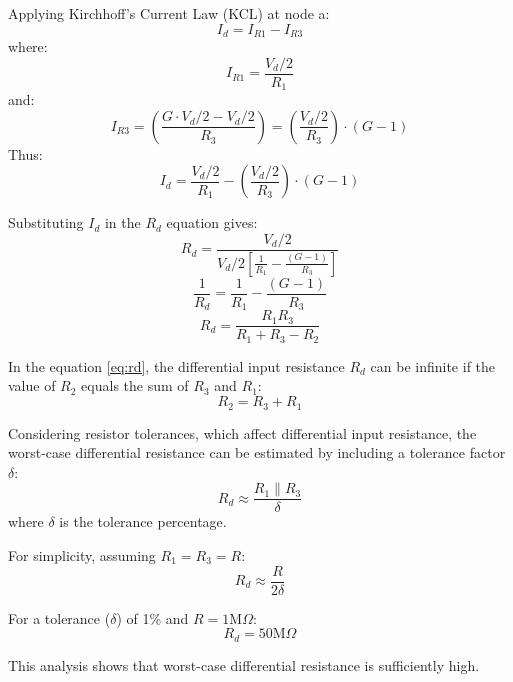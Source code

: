 \begin{itemize}
Applying Kirchhoff's Current Law (KCL) at node a:
\begin{equation}
	I_d = I_{R1} - I_{R3}
	\label{eq:kcl}
\end{equation}
where:
\begin{equation}
	I_{R1} = \frac{V_d / 2}{R_1}
	\label{eq:ir1}
\end{equation}
and:
\begin{equation}
	I_{R3} = \left( \frac{G \cdot V_d / 2 - V_d / 2}{R_3} \right) = \left( \frac{V_d / 2}{R_3} \right) \cdot (G - 1)
	\label{eq:ir3}
\end{equation}
Thus:
\begin{equation}
	I_d = \frac{V_d / 2}{R_1} - \left( \frac{V_d / 2}{R_3} \right) \cdot (G - 1)
	\label{eq:id}
\end{equation}

Substituting \(I_d\) in the \(R_d\) equation gives:
\[
R_d = \frac{V_d / 2}{V_d / 2 \left[ \frac{1}{R_1} - \frac{(G - 1)}{R_3} \right]}
\]
\[
\frac{1}{R_d} = \frac{1}{R_1} - \frac{(G - 1)}{R_3}
\]
\begin{equation}
	R_d = \frac{R_1 R_3}{R_1 + R_3 - R_2}
	\label{eq:rd}
\end{equation}

In the equation \eqref{eq:rd}, the differential input resistance \(R_d\) can be infinite if the value of \(R_2\) equals the sum of \(R_3\) and \(R_1\):
\begin{equation}
	R_2 = R_3 + R_1
	\label{eq:r2}
\end{equation}

Considering resistor tolerances, which affect differential input resistance, the worst-case differential resistance can be estimated by including a tolerance factor \(\delta\):
\begin{equation}
	R_d \approx \frac{R_1 \parallel R_3}{\delta}
	\label{eq:tolerance}
\end{equation}
where \(\delta\) is the tolerance percentage.

For simplicity, assuming \(R_1 = R_3 = R\):
\begin{equation}
	R_d \approx \frac{R}{2\delta}
	\label{eq:simple_rd}
\end{equation}

For a tolerance (\(\delta\)) of 1\% and \(R = 1 \text{M}\Omega\):
\begin{equation}
	R_d = 50 \text{M}\Omega
	\label{eq:final_rd}
\end{equation}

This analysis shows that worst-case differential resistance is sufficiently high. 




\end{itemize}
